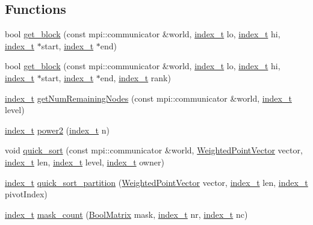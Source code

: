 \subsection*{Functions}
\begin{CompactItemize}
\item 
bool \hyperlink{namespacecowichan__mpi_bb7c07d8b23660efe06c7ee12d60bbdc}{get\_\-block} (const mpi::communicator \&world, \hyperlink{cowichan_8hpp_5b04577d5d21124855deaad298595371}{index\_\-t} lo, \hyperlink{cowichan_8hpp_5b04577d5d21124855deaad298595371}{index\_\-t} hi, \hyperlink{cowichan_8hpp_5b04577d5d21124855deaad298595371}{index\_\-t} $\ast$start, \hyperlink{cowichan_8hpp_5b04577d5d21124855deaad298595371}{index\_\-t} $\ast$end)
\item 
bool \hyperlink{namespacecowichan__mpi_413bf41c8bf73b560d1c16a8e5206e5f}{get\_\-block} (const mpi::communicator \&world, \hyperlink{cowichan_8hpp_5b04577d5d21124855deaad298595371}{index\_\-t} lo, \hyperlink{cowichan_8hpp_5b04577d5d21124855deaad298595371}{index\_\-t} hi, \hyperlink{cowichan_8hpp_5b04577d5d21124855deaad298595371}{index\_\-t} $\ast$start, \hyperlink{cowichan_8hpp_5b04577d5d21124855deaad298595371}{index\_\-t} $\ast$end, \hyperlink{cowichan_8hpp_5b04577d5d21124855deaad298595371}{index\_\-t} rank)
\item 
\hyperlink{cowichan_8hpp_5b04577d5d21124855deaad298595371}{index\_\-t} \hyperlink{namespacecowichan__mpi_7f82c459ad086060228b2bd8100bf9c7}{getNumRemainingNodes} (const mpi::communicator \&world, \hyperlink{cowichan_8hpp_5b04577d5d21124855deaad298595371}{index\_\-t} level)
\item 
\hyperlink{cowichan_8hpp_5b04577d5d21124855deaad298595371}{index\_\-t} \hyperlink{namespacecowichan__mpi_a7c14e0bec9c9da1d56a348c9a0cf1f8}{power2} (\hyperlink{cowichan_8hpp_5b04577d5d21124855deaad298595371}{index\_\-t} n)
\item 
void \hyperlink{namespacecowichan__mpi_4ab537d0df99e9011b206c7259e82d35}{quick\_\-sort} (const mpi::communicator \&world, \hyperlink{class_weighted_point}{WeightedPointVector} vector, \hyperlink{cowichan_8hpp_5b04577d5d21124855deaad298595371}{index\_\-t} len, \hyperlink{cowichan_8hpp_5b04577d5d21124855deaad298595371}{index\_\-t} level, \hyperlink{cowichan_8hpp_5b04577d5d21124855deaad298595371}{index\_\-t} owner)
\item 
\hyperlink{cowichan_8hpp_5b04577d5d21124855deaad298595371}{index\_\-t} \hyperlink{namespacecowichan__mpi_83904b95f448398ff15331182ee0c007}{quick\_\-sort\_\-partition} (\hyperlink{class_weighted_point}{WeightedPointVector} vector, \hyperlink{cowichan_8hpp_5b04577d5d21124855deaad298595371}{index\_\-t} len, \hyperlink{cowichan_8hpp_5b04577d5d21124855deaad298595371}{index\_\-t} pivotIndex)
\item 
\hyperlink{cowichan_8hpp_5b04577d5d21124855deaad298595371}{index\_\-t} \hyperlink{namespacecowichan__mpi_a54004a105356573d4bac92e1b234aa2}{mask\_\-count} (\hyperlink{cowichan_8hpp_a64c8df2f1e9c8ea68a7bcc19aca683e}{BoolMatrix} mask, \hyperlink{cowichan_8hpp_5b04577d5d21124855deaad298595371}{index\_\-t} nr, \hyperlink{cowichan_8hpp_5b04577d5d21124855deaad298595371}{index\_\-t} nc)
\end{CompactItemize}


